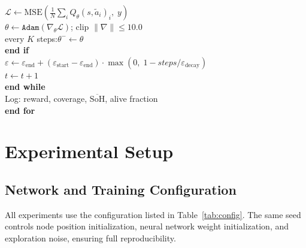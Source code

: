 \documentclass[journal]{IEEEtran}
\begin{document}
\begin{algorithm}[!t]
\begin{tabbing}
\>\>\> $\mathcal{L} \leftarrow
       \mathrm{MSE}\!\left(\tfrac{1}{N}\sum_i
       Q_\theta(s,\tilde{a}_i)_i,\;y\right)$\\
\>\>\> $\theta \leftarrow \texttt{Adam}(\nabla_\theta\mathcal{L})$;\quad
       clip $\|\nabla\| \leq 10.0$\\
\>\>\> every $K$ steps:\quad $\theta^- \leftarrow \theta$\\
\>\> \textbf{end if}\\
\>\> $\varepsilon \leftarrow \varepsilon_{\mathrm{end}}
     + (\varepsilon_{\mathrm{start}}{-}\varepsilon_{\mathrm{end}})
     \cdot \max(0,\;1{-}\mathit{steps}/\varepsilon_{\mathrm{decay}})$\\
\>\> $t \leftarrow t + 1$\\
\> \textbf{end while}\\
\> Log: reward, coverage,
  $\overline{\mathrm{SoH}}$, alive fraction\\
\textbf{end for}
\end{tabbing}
\end{algorithm}

\section{Experimental Setup}
\label{sec:experiments}

\subsection{Network and Training Configuration}

All experiments use the configuration listed in
Table~\ref{tab:config}. The same seed controls node position
initialization, neural network weight initialization, and exploration
noise, ensuring full reproducibility.
\end{document}
